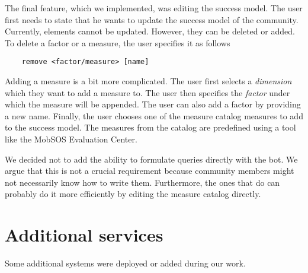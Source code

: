 The final feature, which we implemented, was editing the success model. The user first needs to state that he wants to update the success model of the community.
Currently, elements cannot be updated. 
However, they can be deleted or added. 
To delete a factor or a measure, the user specifies it as follows 
\begin{lstlisting}
    remove <factor/measure> [name]
\end{lstlisting}  
Adding a measure is a bit more complicated. The user first selects a \emph{dimension} which they want to add a measure to. The user then specifies the \emph{factor} under which the measure will be appended. The user can also add a factor by providing a new name. Finally, the user chooses one of the measure catalog measures to add to the success model. 
The measures from the catalog are predefined using a tool like the MobSOS Evaluation Center. 

We decided not to add the ability to formulate queries directly with the bot. 
We argue that this is not a crucial requirement because community members might not necessarily know how to write them. Furthermore, the ones that do can probably do it more efficiently by editing the measure catalog directly.




\section{Additional services}\label{sec:additional}
Some additional systems were deployed or added during our work.

